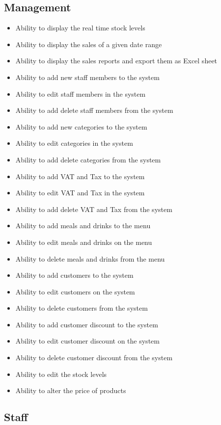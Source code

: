 \subsection{Management}
\begin{itemize}
  \item Ability to display the real time stock levels
  \item Ability to display the sales of a given date range
  \item Ability to display the sales reports and export them as Excel sheet
  \item Ability to add new staff members to the system
  \item Ability to edit staff members in the system
  \item Ability to add delete staff members from the system
  \item Ability to add new categories to the system
  \item Ability to edit categories in the system
  \item Ability to add delete categories from the system
  \item Ability to add VAT and Tax to the system
  \item Ability to edit VAT and Tax in the system
  \item Ability to add delete VAT and Tax from the system
  \item Ability to add meals and drinks to the menu
  \item Ability to edit meals and drinks on the menu
  \item Ability to delete meals and drinks from the menu
  \item Ability to add customers to the system
  \item Ability to edit customers on the system
  \item Ability to delete customers from the system
  \item Ability to add customer discount to the system
  \item Ability to edit customer discount on the system
  \item Ability to delete customer discount from the system
  \item Ability to edit the stock levels
  \item Ability to alter the price of products
\end{itemize}
	

\subsection{Staff}

